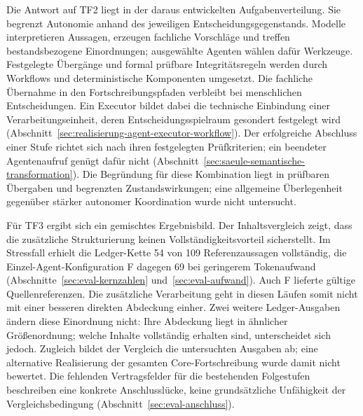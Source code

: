 Die Antwort auf TF2 liegt in der daraus entwickelten Aufgabenverteilung.
Sie begrenzt Autonomie anhand des jeweiligen Entscheidungsgegenstands.
Modelle interpretieren Aussagen,
erzeugen fachliche Vorschläge und treffen bestandsbezogene Einordnungen;
ausgewählte Agenten wählen dafür Werkzeuge. Festgelegte Übergänge und
formal prüfbare Integritätsregeln werden durch Workflows und deterministische
Komponenten umgesetzt. Die fachliche Übernahme in den Fortschreibungspfaden
verbleibt bei menschlichen Entscheidungen. Ein Executor bildet dabei die
technische Einbindung einer Verarbeitungseinheit, deren Entscheidungsspielraum
gesondert festgelegt wird
(Abschnitt~\ref{sec:realisierung-agent-executor-workflow}). Der erfolgreiche
Abschluss einer Stufe richtet sich nach ihren festgelegten
Prüfkriterien; ein beendeter Agentenaufruf genügt dafür nicht
(Abschnitt~\ref{sec:saeule-semantische-transformation}). Die Begründung
für diese Kombination liegt in prüfbaren Übergaben und begrenzten
Zustandswirkungen; eine allgemeine Überlegenheit gegenüber stärker
autonomer Koordination wurde nicht untersucht.

Für TF3 ergibt sich ein gemischtes Ergebnisbild. Der Inhaltsvergleich
zeigt, dass die zusätzliche Strukturierung keinen Vollständigkeitsvorteil
sicherstellt. Im Stressfall erhielt die Ledger-Kette
54 von 109 Referenzaussagen vollständig, die Einzel-Agent-Konfiguration F
dagegen 69 bei geringerem Tokenaufwand
(Abschnitte~\ref{sec:eval-kernzahlen} und~\ref{sec:eval-aufwand}). Auch F
lieferte gültige Quellenreferenzen. Die zusätzliche Verarbeitung geht in
diesen Läufen somit nicht mit einer besseren direkten Abdeckung einher.
Zwei weitere Ledger-Ausgaben ändern diese Einordnung nicht: Ihre
Abdeckung liegt in ähnlicher Größenordnung; welche Inhalte vollständig
erhalten sind, unterscheidet sich jedoch.
Zugleich bildet der Vergleich die
untersuchten Ausgaben ab; eine alternative Realisierung der gesamten
Core-Fortschreibung wurde damit nicht bewertet. Die fehlenden Vertragsfelder
für die bestehenden Folgestufen beschreiben eine konkrete Anschlusslücke,
keine grundsätzliche Unfähigkeit der Vergleichsbedingung
(Abschnitt~\ref{sec:eval-anschluss}).

